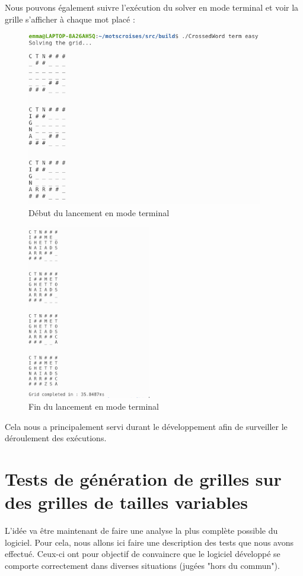 \documentclass [ 11 pt ] {article}
\begin{document}
Nous pouvons également suivre l'exécution du solver en mode terminal et voir la grille s'afficher à chaque mot placé :
 \begin{figure}[H] 
 \center 
 \includegraphics[height=3in]{resultats/terminal_1.png}
 \caption{Début du lancement en mode terminal}
 \end{figure}
  \begin{figure}[H] 
 \center 
 \includegraphics[height=3in]{resultats/terminal_2.png}
 \caption{Fin du lancement en mode terminal}
 \end{figure}

Cela nous a principalement servi durant le développement afin de surveiller le déroulement des exécutions.

\newpage

\section{Tests de génération de grilles sur des grilles de tailles variables}
    L'idée va être maintenant de faire une analyse la plus complète possible du logiciel. Pour cela, nous allons ici faire une description des tests que nous avons effectué. Ceux-ci ont pour objectif de convaincre que le logiciel développé se comporte correctement dans diverses situations (jugées "hors du commun"). \\
    
\end{document}
